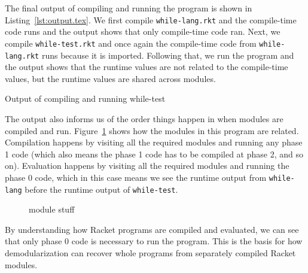 The final output of compiling and running the program is shown in Listing~\ref{lst:output.tex}. 
We first compile \texttt{while-lang.rkt} and the compile-time code runs and the output shows that only compile-time code ran.
Next, we compile \texttt{while-test.rkt} and once again the compile-time code from \texttt{while-lang.rkt} runs because it is imported.
Following that, we run the program and the output shows that the runtime values are not related to the compile-time values, but the runtime values are shared across modules.

\begin{listing}
  \centering
  
  \caption{Output of compiling and running while-test}
  \label{lst:output.tex}
\end{listing}

The output also informs us of the order things happen in when modules are compiled and run. 
Figure~\ref{fig:modules} shows how the modules in this program are related.
Compilation happens by visiting all the required modules and running any phase 1 code (which also means the phase 1 code has to be compiled at phase 2, and so on). 
Evaluation happens by visiting all the required modules and running the phase 0 code, which in this case means we see the runtime output from \texttt{while-lang} before the runtime output of \texttt{while-test}.

\begin{figure}
  \centering
  
  \caption{module stuff}
  \label{fig:modules}
\end{figure}

By understanding how Racket programs are compiled and evaluated, we can see that only phase 0 code is necessary to run the program. 
This is the basis for how demodularization can recover whole programs from separately compiled Racket modules. 
